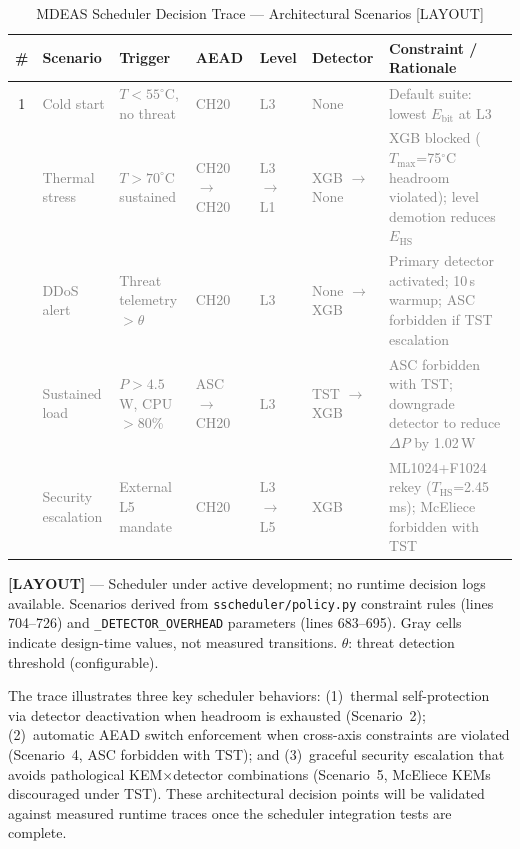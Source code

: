 \begin{table}[t]
\centering
\caption{MDEAS Scheduler Decision Trace — Architectural Scenarios [LAYOUT]}
\label{tab:sched_trace}
\footnotesize
\begin{tabular}{@{}clllllp{4.5cm}@{}}
\toprule
\textbf{\#} & \textbf{Scenario} & \textbf{Trigger} &
  \textbf{AEAD} & \textbf{Level} & \textbf{Detector} &
  \textbf{Constraint / Rationale} \\
\midrule
1 & \textcolor{gray}{Cold start} &
    \textcolor{gray}{$T < 55^\circ$C, no threat} &
    \textcolor{gray}{CH20} &
    \textcolor{gray}{L3} &
    \textcolor{gray}{None} &
    \textcolor{gray}{Default suite: lowest $E_\text{bit}$ at L3} \\
\addlinespace
2 & \textcolor{gray}{Thermal stress} &
    \textcolor{gray}{$T > 70^\circ$C sustained} &
    \textcolor{gray}{CH20 $\to$ CH20} &
    \textcolor{gray}{L3 $\to$ L1} &
    \textcolor{gray}{XGB $\to$ None} &
    \textcolor{gray}{XGB blocked ($T_\text{max}$=75$^\circ$C headroom violated); level demotion reduces $E_\text{HS}$} \\
\addlinespace
3 & \textcolor{gray}{DDoS alert} &
    \textcolor{gray}{Threat telemetry $> \theta$} &
    \textcolor{gray}{CH20} &
    \textcolor{gray}{L3} &
    \textcolor{gray}{None $\to$ XGB} &
    \textcolor{gray}{Primary detector activated; 10\,s warmup; ASC forbidden if TST escalation} \\
\addlinespace
4 & \textcolor{gray}{Sustained load} &
    \textcolor{gray}{$P > 4.5$\,W, CPU $> 80$\%} &
    \textcolor{gray}{ASC $\to$ CH20} &
    \textcolor{gray}{L3} &
    \textcolor{gray}{TST $\to$ XGB} &
    \textcolor{gray}{ASC forbidden with TST; downgrade detector to reduce $\Delta P$ by 1.02\,W} \\
\addlinespace
5 & \textcolor{gray}{Security escalation} &
    \textcolor{gray}{External L5 mandate} &
    \textcolor{gray}{CH20} &
    \textcolor{gray}{L3 $\to$ L5} &
    \textcolor{gray}{XGB} &
    \textcolor{gray}{ML1024+F1024 rekey ($T_\text{HS}$=2.45\,ms); McEliece forbidden with TST} \\
\bottomrule
\end{tabular}
\begin{tablenotes}
\footnotesize
\item \textbf{[LAYOUT]} — Scheduler under active development; no runtime
  decision logs available.  Scenarios derived from
  \texttt{sscheduler/policy.py} constraint rules (lines 704--726) and
  \texttt{\_DETECTOR\_OVERHEAD} parameters (lines 683--695).
  Gray cells indicate design-time values, not measured transitions.
  $\theta$: threat detection threshold (configurable).
\end{tablenotes}
\end{table}

The trace illustrates three key scheduler behaviors: (1)~thermal
self-protection via detector deactivation when headroom is exhausted
(Scenario~2); (2)~automatic AEAD switch enforcement when
cross-axis constraints are violated (Scenario~4, ASC forbidden with
TST); and (3)~graceful security escalation that avoids pathological
KEM$\times$detector combinations (Scenario~5, McEliece KEMs
discouraged under TST).  These architectural decision points will
be validated against measured runtime traces once the scheduler
integration tests are complete.
